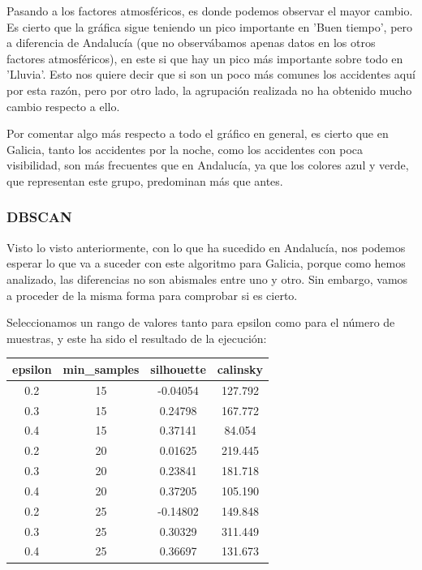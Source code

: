 \documentclass[11pt,a4paper]{article}
\begin{document}
Pasando a los factores atmosféricos, es donde podemos observar el mayor cambio. Es cierto que la gráfica sigue teniendo un pico
importante en 'Buen tiempo', pero a diferencia de Andalucía (que no observábamos apenas datos en los otros factores atmosféricos),
en este si que hay un pico más importante sobre todo en 'Lluvia'. Esto nos quiere decir que si son un poco más comunes los accidentes
aquí por esta razón, pero por otro lado, la agrupación realizada no ha obtenido mucho cambio respecto a ello.

Por comentar algo más respecto a todo el gráfico en general, es cierto que en Galicia, tanto los accidentes por la noche, como los
accidentes con poca visibilidad, son más frecuentes que en Andalucía, ya que los colores azul y verde, que representan este grupo,
predominan más que antes.


\subsubsection*{DBSCAN}

Visto lo visto anteriormente, con lo que ha sucedido en Andalucía, nos podemos esperar lo que va a suceder con este algoritmo para
Galicia, porque como hemos analizado, las diferencias no son abismales entre uno y otro. Sin embargo, vamos a proceder de la misma
forma para comprobar si es cierto.

Seleccionamos un rango de valores tanto para epsilon como para el número de muestras, y este ha sido el resultado de la ejecución:

\begin{table}[H]
    \centering
    \begin{tabular}{|c|c|c|c|}
    \hline
    \textbf{epsilon} & \textbf{min\_samples} & \textbf{silhouette} & \textbf{calinsky} \\ \hline
    0.2 & 15 & -0.04054 & 127.792 \\ \hline
    0.3 & 15 & 0.24798 & 167.772 \\ \hline
    0.4 & 15 & 0.37141 & 84.054 \\ \hline
    0.2 & 20 & 0.01625 & 219.445 \\ \hline
    0.3 & 20 & 0.23841 & 181.718 \\ \hline
    0.4 & 20 & 0.37205 & 105.190 \\ \hline
    0.2 & 25 & -0.14802 & 149.848 \\ \hline
    0.3 & 25 & 0.30329 & 311.449 \\ \hline
    0.4 & 25 & 0.36697 & 131.673 \\ \hline
    \end{tabular}
\end{table}
\end{document}
